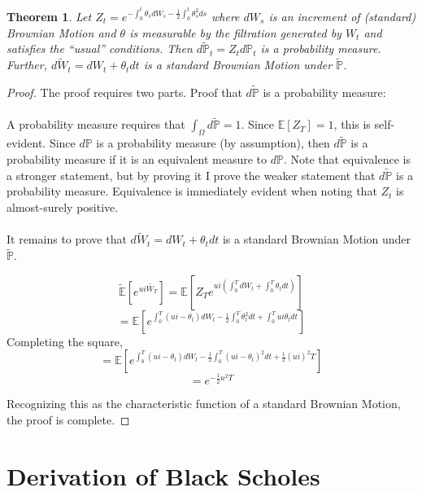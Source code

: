 \documentclass{article}
\newtheorem{theorem}{Theorem}
\begin{document}
\begin{theorem}
	Let \( Z_t=e^{-\int_0 ^t \theta_s dW_s-\frac{1}{2} \int_0 ^ t \theta^2 _s ds} \) where \(dW_s\) is an increment of (standard) Brownian Motion and \(\theta\) is measurable by the filtration generated by \(W_t\) and satisfies the ``usual'' conditions.  Then \(d\mathbb{\tilde{P}}_t=Z_t d\mathbb{P}_t\) is a probability measure. Further, \(d\tilde{W}_t=dW_t+\theta_t dt\) is a standard Brownian Motion under \(\mathbb{\tilde{P}}\).
\end{theorem}
\begin{proof}
The proof requires two parts.  Proof that \( d \mathbb{ \tilde{P} } \) is a probability measure:
\\
\\
A probability measure requires that \( \int_\Omega d \mathbb{ \tilde{P} }=1\).  Since \( \mathbb{E}[Z_T]=1\), this is self-evident.  Since \(d\mathbb{P}\) is a probability measure (by assumption), then \(d\mathbb{\tilde{P}}\) is a probability measure if it is an equivalent measure to \(d\mathbb{P}\).  Note that equivalence is a stronger statement, but by proving it I prove the weaker statement that \(d \mathbb{\tilde{P}}\) is a probability measure.  Equivalence is immediately evident when noting that \(Z_t\) is almost-surely positive.  
\\
\\
It remains to prove that \(d\tilde{W}_t=dW_t+\theta_t dt\) is a standard Brownian Motion under \(\mathbb{\tilde{P}}\).

\[\mathbb{\tilde{E}}\left[e^{ui\tilde{W_T}}\right]=\mathbb{E}\left[Z_Te^{ui \left(\int_0 ^ T dW_t+\int_0^T \theta_t dt\right)}\right]\]
\[=\mathbb{E}\left[e^{\int_0 ^T (ui-\theta_t)dW_t-\frac{1}{2}\int_0^T \theta^2_t dt + \int_0^T ui\theta_t dt}\right]\]
Completing the square, 
\[=\mathbb{E}\left[e^{\int_0 ^T (ui-\theta_t)dW_t-\frac{1}{2}\int_0^T  (ui-\theta_t)^2 dt + \frac{1}{2} (ui)^2 T } \right]\]
\[= e^{ -\frac{1}{2} u^2 T }\]

Recognizing this as the characteristic function of a standard Brownian Motion, the proof is complete.
\end{proof}

\section{Derivation of Black Scholes}
\end{document}
